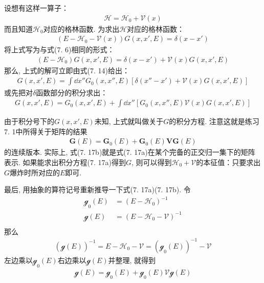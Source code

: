 设想有这样一算子：
\begin{align*}
\mathscr{H = H}_0 + \mathscr{V}(x)
\end{align*}
而且知道$\mathscr{H}_0$对应的格林函数. 
为求出$\mathscr{H}$对应的格林函数：
\begin{align}
(E - \mathscr{H}_0 - \mathscr{V}(x))G(x,x',E) = \delta(x-x')
\end{align}
将上式写为与式(7.
6)相同的形式：
\begin{align*}
(E - \mathscr{H}_0) G(x,x',E) = \delta(x-x') + \mathscr{V}(x)G(x,x',E)
\end{align*}
那么, 
上式的解可立即由式(7.
14)给出：
\begin{align*}
G(x,x',E) = \int\dd x'' G_0(x,x'',E) [ \delta(x''-x') + \mathscr{V}(x)G(x,x',E) ]
\end{align*}
或先把对$\delta$函数部分的积分求出：
\begin{align}
G(x,x',E) = G_0(x,x',E) + \int\dd x'' [G_0(x,x'',E) \mathscr{V}(x)G(x,x',E) ]\tag{7.17a}
\end{align}
\addtocounter{equation}{1}
由于积分号下的$G(x,x',E)$未知, 
上式就叫做关于$G$的积分方程. 
注意这就是练习7.
1中所得关于矩阵的结果
\begin{align}
\mathbf{G}(E) = \mathbf{G}_0(E) + \mathbf{G}_0(E)\mathbf{VG}(E)\tag{7.17b}
\end{align}
的连续版本. 
实际上, 
式(7.
17b)就是式(7.
17a)在某个完备的正交归一集下的矩阵表示. 
如果能求出积分方程(7.
17a)得到$G$, 
则可以得到$\mathscr{H}_0 + \mathscr{V}$的本征值：只要求出$G$爆炸时所对应的$E$即可.


最后, 
用抽象的算符记号重新推导一下式(7.
17a)(7.
17b). 
令
\begin{align*}
\mathscr{g}_0(E) & = (E-\mathscr{H}_0)^{-1}\\
\mathscr{g}(E)   & = (E-\mathscr{H}_0 - \mathscr{V})^{-1}\\
\end{align*}
那么
\begin{align}
( \mathscr{g}(E) )^{-1} = E - \mathscr{H}_0 - \mathscr{V} = (\mathscr{g}_0(E))^{-1} - \mathscr{V} 
\end{align}
左边乘以$\mathscr{g}_0(E)$右边乘以$\mathscr{g}(E)$并整理, 
就得到
\begin{align}
\mathscr{g}(E) = \mathscr{g}_0(E) + \mathscr{g}_0(E)\mathscr{V}\mathscr{g}(E) 
\end{align}

